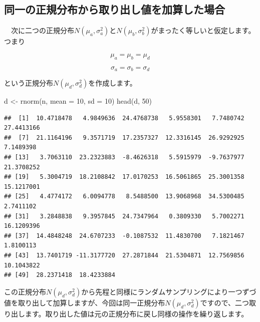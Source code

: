 \documentclass[]{tufte-handout}
\newenvironment{Shaded}{}{}
\newcommand{\AttributeTok}[1]{\textcolor[rgb]{0.49,0.56,0.16}{#1}}
\newcommand{\DecValTok}[1]{\textcolor[rgb]{0.25,0.63,0.44}{#1}}
\newcommand{\FunctionTok}[1]{\textcolor[rgb]{0.02,0.16,0.49}{#1}}
\newcommand{\NormalTok}[1]{#1}
\newcommand{\OtherTok}[1]{\textcolor[rgb]{0.00,0.44,0.13}{#1}}
\begin{document}
\newpage

\hypertarget{ux540cux4e00ux306eux6b63ux898fux5206ux5e03ux304bux3089ux53d6ux308aux51faux3057ux5024ux3092ux52a0ux7b97ux3057ux305fux5834ux5408}{%
\subsection{\texorpdfstring{\textbf{同一の正規分布から取り出し値を加算した場合}}{同一の正規分布から取り出し値を加算した場合}}\label{ux540cux4e00ux306eux6b63ux898fux5206ux5e03ux304bux3089ux53d6ux308aux51faux3057ux5024ux3092ux52a0ux7b97ux3057ux305fux5834ux5408}}

　次に二つの正規分布\(N(\mu_a, \sigma^2_a)\)と\(N(\mu_b,\sigma^2_b)\)がまったく等しいと仮定します。つまり

\[\mu_a = \mu_b = \mu_d\]

\[\sigma_a = \sigma_b = \sigma_d\]

という正規分布\(N(\mu_d, \sigma^2_d)\)を作成します。

\begin{Shaded}
\begin{Highlighting}[numbers=left,,]
\NormalTok{d }\OtherTok{\textless{}{-}} \FunctionTok{rnorm}\NormalTok{(n, }\AttributeTok{mean =} \DecValTok{10}\NormalTok{, }\AttributeTok{sd =} \DecValTok{10}\NormalTok{)}
\FunctionTok{head}\NormalTok{(d, }\DecValTok{50}\NormalTok{)}
\end{Highlighting}
\end{Shaded}

\begin{verbatim}
##  [1]  10.4718478   4.9849636  24.4768738   5.9558301   7.7480742  27.4413166
##  [7]  21.1164196   9.3571719  17.2357327  12.3316145  26.9292925   7.1489398
## [13]   3.7063110  23.2323883  -8.4626318   5.5915979  -9.7637977  21.3708252
## [19]   5.3004719  18.2108842  17.0170253  16.5061865  25.3001358  15.1217001
## [25]   4.4774172   6.0094778   8.5488500  13.9068968  34.5300485   2.7411102
## [31]   3.2848838   9.3957845  24.7347964   0.3809330   5.7002271  16.1209396
## [37]  14.4848248  24.6707233  -0.1087532  11.4830700   7.1821467   1.8100113
## [43]  13.7401719 -11.3177720  27.2871844  21.5304871  12.7569856  10.1043822
## [49]  28.2371418  18.4233884
\end{verbatim}

この正規分布\(N(\mu_d, \sigma^2_d)\)から先程と同様にランダムサンプリングにより一つずづ値を取り出して加算しますが、今回は同一正規分布\(N(\mu_d, \sigma^2_d)\)ですので、二つ取り出します。取り出した値は元の正規分布に戻し同様の操作を繰り返します。
\end{document}
